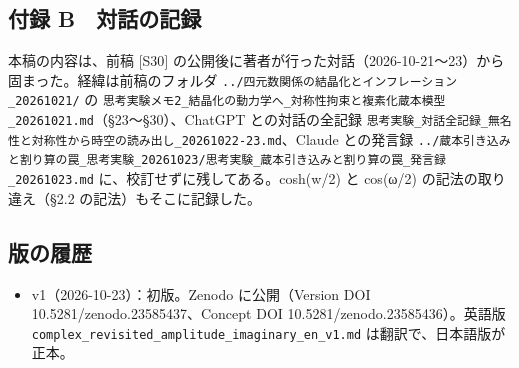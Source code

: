 \documentclass[
  a4paper,
]{ltjsarticle}
\providecommand{\tightlist}{%
  \setlength{\itemsep}{0pt}\setlength{\parskip}{0pt}}
\begin{document}
\subsection{付録
B　対話の記録}\label{ux4ed8ux9332-b-ux5bfeux8a71ux306eux8a18ux9332}

本稿の内容は、前稿 {[}S30{]}
の公開後に著者が行った対話（2026-10-21〜23）から固まった。経緯は前稿のフォルダ
\texttt{../\allowbreak{}四元数関係の結晶化とインフレーション\_\allowbreak{}20261021/\allowbreak{}} の
\texttt{思考実験メモ2\_\allowbreak{}結晶化の動力学へ\_\allowbreak{}対称性拘束と複素化蔵本模型\_\allowbreak{}20261021.md}（§23〜§30）、ChatGPT
との対話の全記録
\texttt{思考実験\_\allowbreak{}対話全記録\_\allowbreak{}無名性と対称性から時空の読み出し\_\allowbreak{}20261022-23.md}、Claude
との発言録
\texttt{../\allowbreak{}蔵本引き込みと割り算の罠\_\allowbreak{}思考実験\_\allowbreak{}20261023/\allowbreak{}思考実験\_\allowbreak{}蔵本引き込みと割り算の罠\_\allowbreak{}発言録\_\allowbreak{}20261023.md}
に、校訂せずに残してある。cosh(w/2) と cos(ω/2) の記法の取り違え（§2.2
の記法）もそこに記録した。

\subsection{版の履歴}\label{ux7248ux306eux5c65ux6b74}

\begin{itemize}
\tightlist
\item
  v1（2026-10-23）：初版。Zenodo に公開（Version DOI
  10.5281/zenodo.23585437、Concept DOI 10.5281/zenodo.23585436）。英語版
  \texttt{complex\_\allowbreak{}revisited\_\allowbreak{}amplitude\_\allowbreak{}imaginary\_\allowbreak{}en\_\allowbreak{}v1.md}
  は翻訳で、日本語版が正本。
\end{itemize}
\end{document}
